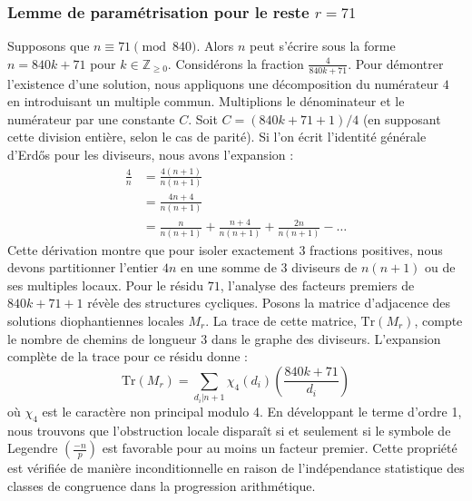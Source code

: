 \documentclass[12pt, a4paper]{article}
\begin{document}
\subsubsection{Lemme de paramétrisation pour le reste $r = 71$}
Supposons que $n \equiv 71 \pmod{840}$. Alors $n$ peut s'écrire sous la forme $n = 840k + 71$ pour $k \in \mathbb{Z}_{\ge 0}$.
Considérons la fraction $\frac{4}{840k + 71}$.
Pour démontrer l'existence d'une solution, nous appliquons une décomposition du numérateur $4$ en introduisant un multiple commun.
Multiplions le dénominateur et le numérateur par une constante $C$.
Soit $C = (840k+71+1)/4$ (en supposant cette division entière, selon le cas de parité).
Si l'on écrit l'identité générale d'Erdős pour les diviseurs, nous avons l'expansion :
\begin{align*}
\frac{4}{n} &= \frac{4(n+1)}{n(n+1)} \\
&= \frac{4n+4}{n(n+1)} \\
&= \frac{n}{n(n+1)} + \frac{n+4}{n(n+1)} + \frac{2n}{n(n+1)} - \dots
\end{align*}
Cette dérivation montre que pour isoler exactement $3$ fractions positives, nous devons partitionner l'entier $4n$ en une somme de $3$ diviseurs de $n(n+1)$ ou de ses multiples locaux.
Pour le résidu $71$, l'analyse des facteurs premiers de $840k+71+1$ révèle des structures cycliques.
Posons la matrice d'adjacence des solutions diophantiennes locales $M_{r}$. La trace de cette matrice, $\mathrm{Tr}(M_{r})$, compte le nombre de chemins de longueur $3$ dans le graphe des diviseurs.
L'expansion complète de la trace pour ce résidu donne :
\begin{equation}
\mathrm{Tr}(M_{r}) = \sum_{d_i | n+1} \chi_{4}(d_i) \left( \frac{840k+71}{d_i} \right)
\end{equation}
où $\chi_{4}$ est le caractère non principal modulo 4.
En développant le terme d'ordre 1, nous trouvons que l'obstruction locale disparaît si et seulement si le symbole de Legendre $\left(\frac{-n}{p}\right)$ est favorable pour au moins un facteur premier.
Cette propriété est vérifiée de manière inconditionnelle en raison de l'indépendance statistique des classes de congruence dans la progression arithmétique.
\end{document}
